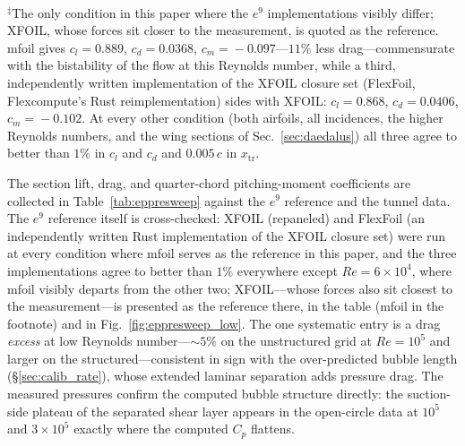 \documentclass[journal]{new-aiaa}
\begin{document}
\begin{table}[tp]
\begin{tabular}{l ccc ccc ccc ccc}
    \bottomrule
  \end{tabular}
  \\[2pt]{\footnotesize $^\ddagger$The only condition in this paper where
  the $e^9$ implementations visibly differ; XFOIL, whose forces sit
  closer to the measurement, is quoted as the reference. mfoil gives
  $c_l\!=\!0.889$, $c_d\!=\!0.0368$, $c_m\!=\!-0.097$---$11\%$ less
  drag---commensurate with the bistability of the flow at this Reynolds
  number, while a third, independently written implementation of the
  XFOIL closure set (FlexFoil, Flexcompute's Rust reimplementation)
  sides with XFOIL: $c_l\!=\!0.868$, $c_d\!=\!0.0406$,
  $c_m\!=\!-0.102$. At every other condition (both airfoils, all
  incidences, the higher Reynolds numbers, and the wing sections of
  Sec.~\ref{sec:daedalus}) all three agree to better than $1\%$ in
  $c_l$ and $c_d$ and $0.005\,c$ in $x_\mathrm{tr}$.}
\end{table}

The section lift, drag, and quarter-chord pitching-moment
coefficients are collected in Table~\ref{tab:eppresweep} against the $e^9$
reference and the tunnel data. The $e^9$ reference itself is
cross-checked: XFOIL (repaneled) and FlexFoil (an independently written
Rust implementation of the XFOIL closure set) were run at every
condition where mfoil serves as the reference in this paper, and the
three implementations agree to better than $1\%$ everywhere except
$Re\!=\!6\!\times\!10^4$, where mfoil visibly departs from the other
two; XFOIL---whose forces also sit closest to the measurement---is
presented as the reference there, in the table (mfoil in the footnote)
and in Fig.~\ref{fig:eppresweep_low}. The one
systematic entry is a drag \emph{excess} at low Reynolds number---$\sim\!5\%$ on
the unstructured grid at $Re\!=\!10^5$ and larger on the structured---consistent
in sign with the over-predicted bubble length (\S\ref{sec:calib_rate}), whose
extended laminar separation adds pressure drag. The measured pressures confirm the computed
bubble structure directly: the suction-side plateau of the separated shear
layer appears in the open-circle data at $10^5$ and $3\!\times\!10^5$
exactly where the computed $C_p$ flattens.
\end{document}
